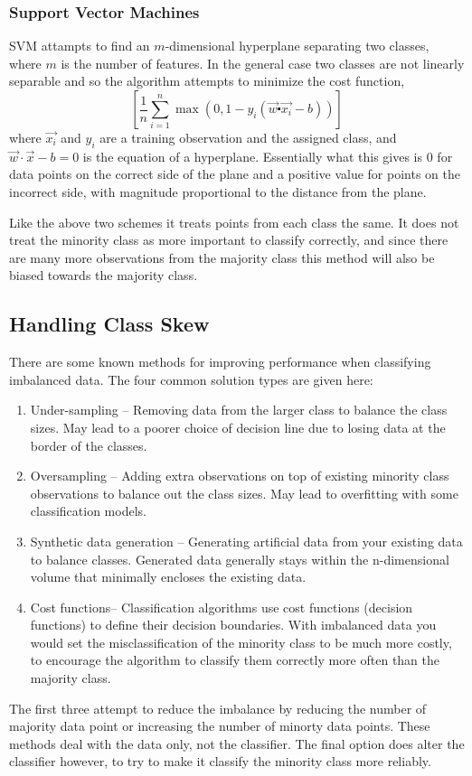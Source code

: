 \documentclass{article}
\begin{document}
\subsubsection{Support Vector Machines}
SVM attampts to find an $m$-dimensional hyperplane separating two classes, where $m$ is the number of features.
In the general case two classes are not linearly separable and so the algorithm attempts to minimize the cost function,
\begin{equation}
	\left[\frac{1}{n}\sum_{i=1}^{n}\max(0,1-y_{i}(\overrightarrow{w}\centerdot\overrightarrow{x_{i}}-b))\right]
\end{equation}
where $\overrightarrow{x_{i}}$ and $y_{i}$ are a training observation and the assigned class, and $\vec{w} \cdot {\vec {x}}-b=0$ is the equation of a hyperplane. Essentially what this gives is 0 for data points on the correct side of the plane and a positive value for points on the incorrect side, with magnitude proportional to the distance from the plane.

Like the above two schemes it treats points from each class the same. It does not treat the minority class as more important to classify correctly, and since there are many more observations from the majority class this method will also be biased towards the majority class.

\subsection{Handling Class Skew}
There are some known methods for improving performance when classifying imbalanced data. The four common solution types are given here:
\begin{enumerate}
\item Under-sampling -- Removing data from the larger class to balance the class sizes.
May lead to a poorer choice of decision line due to losing data at the border of the classes.
\item Oversampling -- Adding extra observations on top of existing minority class observations to balance out the class sizes.
May lead to overfitting with some classification models.
\item Synthetic data generation -- Generating artificial data from your existing data to balance classes.
Generated data generally stays within the n-dimensional volume that minimally encloses the existing data.
\item Cost functions-- Classification algorithms use cost functions (decision functions) to define their decision boundaries.
With imbalanced data you would set the misclassification of the minority class to be much more costly, to encourage the algorithm to classify them correctly more often than the majority class.
\end{enumerate}
The first three attempt to reduce the imbalance by reducing the number of majority data point or increasing the number of minorty data points.
These methods deal with the data only, not the classifier.
The final option does alter the classifier however, to try to make it classify the minority class more reliably.
\end{document}
